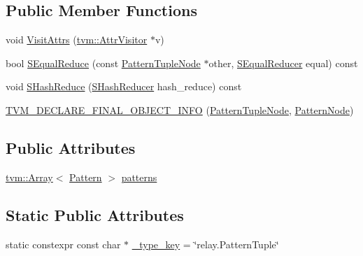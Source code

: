 \subsection*{Public Member Functions}
\begin{DoxyCompactItemize}
\item 
void \hyperlink{classtvm_1_1relay_1_1PatternTupleNode_a4daacd2ff3b4240afcb6a04d4759af93}{Visit\+Attrs} (\hyperlink{classtvm_1_1AttrVisitor}{tvm\+::\+Attr\+Visitor} $\ast$v)
\item 
bool \hyperlink{classtvm_1_1relay_1_1PatternTupleNode_afe4beb73174745390b720b945ccc4a53}{S\+Equal\+Reduce} (const \hyperlink{classtvm_1_1relay_1_1PatternTupleNode}{Pattern\+Tuple\+Node} $\ast$other, \hyperlink{classtvm_1_1SEqualReducer}{S\+Equal\+Reducer} equal) const 
\item 
void \hyperlink{classtvm_1_1relay_1_1PatternTupleNode_abb2897abc7ff168759b44a620cccc6a7}{S\+Hash\+Reduce} (\hyperlink{classtvm_1_1SHashReducer}{S\+Hash\+Reducer} hash\+\_\+reduce) const 
\item 
\hyperlink{classtvm_1_1relay_1_1PatternTupleNode_a51cb822b6c83112e597fcfaff12882d0}{T\+V\+M\+\_\+\+D\+E\+C\+L\+A\+R\+E\+\_\+\+F\+I\+N\+A\+L\+\_\+\+O\+B\+J\+E\+C\+T\+\_\+\+I\+N\+FO} (\hyperlink{classtvm_1_1relay_1_1PatternTupleNode}{Pattern\+Tuple\+Node}, \hyperlink{classtvm_1_1relay_1_1PatternNode}{Pattern\+Node})
\end{DoxyCompactItemize}
\subsection*{Public Attributes}
\begin{DoxyCompactItemize}
\item 
\hyperlink{classtvm_1_1Array}{tvm\+::\+Array}$<$ \hyperlink{classtvm_1_1relay_1_1Pattern}{Pattern} $>$ \hyperlink{classtvm_1_1relay_1_1PatternTupleNode_aaf8d4cf8916e845d4528b8286c8d4095}{patterns}
\end{DoxyCompactItemize}
\subsection*{Static Public Attributes}
\begin{DoxyCompactItemize}
\item 
static constexpr const char $\ast$ \hyperlink{classtvm_1_1relay_1_1PatternTupleNode_a755c2c1c58c99866cef6991d85d10e5c}{\+\_\+type\+\_\+key} = \char`\"{}relay.\+Pattern\+Tuple\char`\"{}
\end{DoxyCompactItemize}



